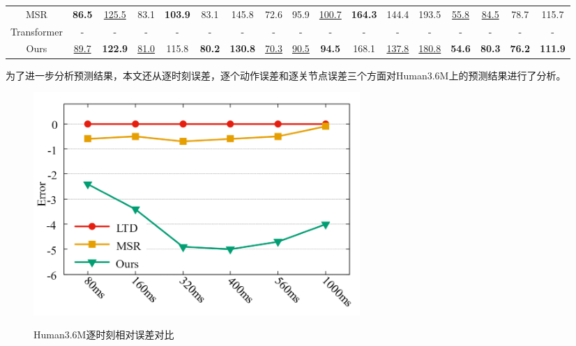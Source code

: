 \begin{table}[h]
{\begin{tabular}{c|cc|cc|cc|cc|cc|cc|cc|cc}
MSR   & \textbf{86.5} & \underline{125.5}          & 83.1          & \textbf{103.9} & 83.1           & 145.8          & 72.6            & 95.9          & \underline{100.7}         & \textbf{164.3} & 144.4          & 193.5          & \underline{55.8}             & \underline{84.5}             & 78.7           & 115.7          \\
Transformer & -             & -              & -             & -              & -              & -              & -               & -             & -             & -              & -              & -              & -                & -                & -              & -              \\
Ours   & \underline{89.7}          & \textbf{122.9} & \underline{81.0} & 115.8          & \textbf{80.2}  & \textbf{130.8} & \underline{70.3}   & \underline{90.5} & \textbf{94.5} & 168.1          & \underline{137.8} & \underline{180.8}          & \textbf{54.6}    & \textbf{80.3}    & \textbf{76.2}  & \textbf{111.9} \\ \hline
\end{tabular}
}
\label{table:human3.6 long-term 8}
\end{table}
\clearpage


为了进一步分析预测结果，本文还从逐时刻误差，逐个动作误差和逐关节点误差三个方面对Human3.6M上的预测结果进行了分析。
\begin{figure}[ht]
    \centering
    \includegraphics[width=0.60\textwidth]{FigMa/per_time.png}\\
    \vspace{-0.3cm}
    \caption{Human3.6M逐时刻相对误差对比}
    \label{fig:per_time_error}
\end{figure}

